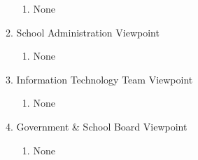 \documentclass[]{article}
\begin{document}
\begin{enumerate}[{BE}1.]
\begin{enumerate}[{VP1}.1]
			\begin{enumerate}
				\item None
			\end{enumerate}
		\item School Administration Viewpoint
			\begin{enumerate}
				\item None
			\end{enumerate}
		\item Information Technology Team Viewpoint
			\begin{enumerate}
				\item None
			\end{enumerate}
		\item Government \& School Board Viewpoint
			\begin{enumerate}
				\item None
			\end{enumerate}
	\end{enumerate}


\end{enumerate}
\end{document}
